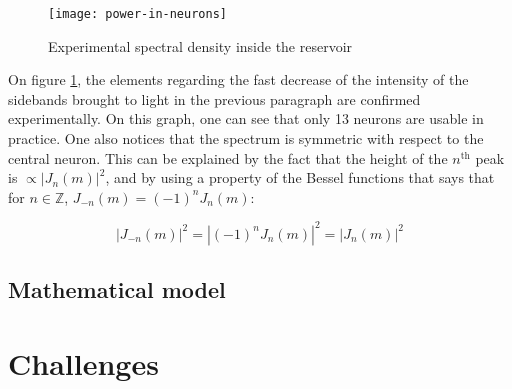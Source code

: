 \begin{figure}[h]
	\centering
	\texttt{[image: power-in-neurons]}
	\caption{Experimental spectral density inside the reservoir \cite{AkroutAkram2016Pprc}}
	\label{power-in-neurons}
\end{figure}

On figure \ref{power-in-neurons}, the elements regarding the fast decrease of the intensity of the sidebands brought to light in the previous paragraph are confirmed experimentally. On this graph, one can see that only 13 neurons are usable in practice. One also notices that the spectrum is symmetric with respect to the central neuron. This can be explained by the fact that the height of the $n^{\text{th}}$ peak is $\propto |J_n(m)|^2$, and by using a property of the Bessel functions that says that for $n \in \mathbb{Z}$, $J_{-n}(m)=(-1)^n J_n(m)$:

\begin{equation}
	|J_{-n}(m)|^2 = |(-1)^n J_n(m)|^2 = |J_n(m)|^2
\end{equation}


\subsection{Mathematical model}


\section{Challenges}

\label{sec-challenges-wdm}












